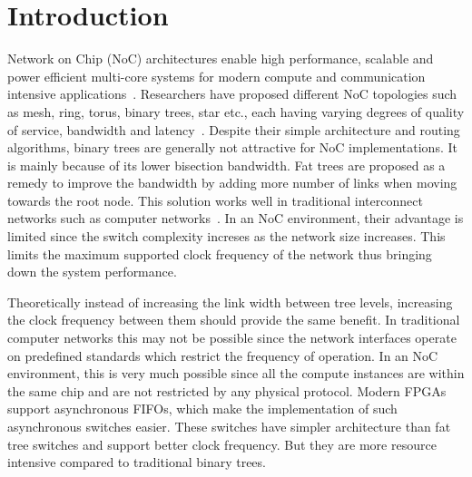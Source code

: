 \section{Introduction}
Network on Chip (NoC) architectures enable high performance, scalable and power efficient multi-core systems for modern compute and communication intensive applications~\cite{Joshi2007,Neeb2005}.
Researchers have proposed different NoC topologies such as mesh, ring, torus, binary trees, star etc., each having varying degrees of quality of service, bandwidth and latency~\cite{Dally2003,Kumar2002}.
Despite their simple architecture and routing algorithms, binary trees are generally not attractive for NoC implementations.
It is mainly because of its lower bisection bandwidth.
Fat trees are proposed as a remedy to improve the bandwidth by adding more number of links when moving towards the root node.
This solution works well in traditional interconnect networks such as computer networks~\cite{Shainer2011}.
In an NoC environment, their advantage is limited since the switch complexity increses as the network size increases.
This limits the maximum supported clock frequency of the network thus bringing down the system performance. 

Theoretically instead of increasing the link width between tree levels, increasing the clock frequency between them should provide the same benefit.
In traditional computer networks this may not be possible since the network interfaces operate on predefined standards which restrict the frequency of operation.
In an NoC environment, this is very much possible since all the compute instances are within the same chip and are not restricted by any physical protocol. 
Modern FPGAs support asynchronous FIFOs, which make the implementation of such asynchronous switches easier.
These switches have simpler architecture than fat tree switches and support better clock frequency.
But they are more resource intensive compared to traditional binary trees.

